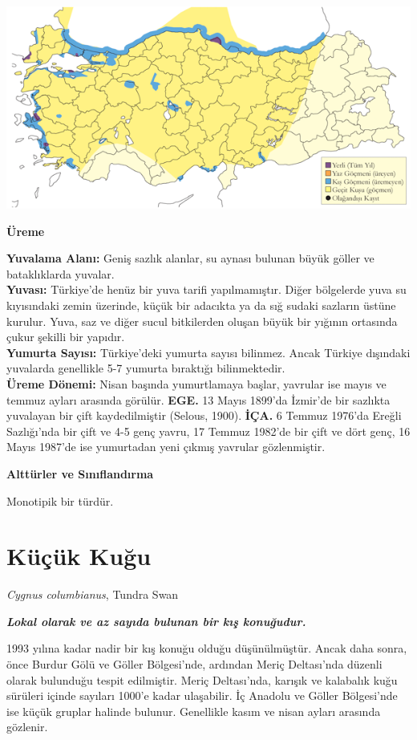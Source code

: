 \documentclass[
  a4paper,
  DIV=11,
  numbers=noendperiod]{scrreprt}
\begin{document}
\includegraphics{images/harita_Page_008.png}

\textbf{Üreme}

\textbf{Yuvalama Alanı:} Geniş sazlık alanlar, su aynası bulunan büyük
göller ve bataklıklarda yuvalar.\\
\textbf{Yuvası:} Türkiye'de henüz bir yuva tarifi yapılmamıştır. Diğer
bölgelerde yuva su kıyısındaki zemin üzerinde, küçük bir adacıkta ya da
sığ sudaki sazların üstüne kurulur. Yuva, saz ve diğer sucul bitkilerden
oluşan büyük bir yığının ortasında çukur şekilli bir yapıdır.\\
\textbf{Yumurta Sayısı:} Türkiye'deki yumurta sayısı bilinmez. Ancak
Türkiye dışındaki yuvalarda genellikle 5-7 yumurta bıraktığı
bilinmektedir.\\
\textbf{Üreme Dönemi:} Nisan başında yumurtlamaya başlar, yavrular ise
mayıs ve temmuz ayları arasında görülür. \textbf{EGE.} 13 Mayıs 1899'da
İzmir'de bir sazlıkta yuvalayan bir çift kaydedilmiştir (Selous, 1900).
\textbf{İÇA.} 6 Temmuz 1976'da Ereğli Sazlığı'nda bir çift ve 4-5 genç
yavru, 17 Temmuz 1982'de bir çift ve dört genç, 16 Mayıs 1987'de ise
yumurtadan yeni çıkmış yavrular gözlenmiştir.

\textbf{Alttürler ve Sınıflandırma}

Monotipik bir türdür.

\section{Küçük Kuğu}\label{kuxfcuxe7uxfck-kuux11fu}

\emph{Cygnus columbianus}, Tundra Swan

\textbf{\emph{Lokal olarak ve az sayıda bulunan bir kış konuğudur.}}

1993 yılına kadar nadir bir kış konuğu olduğu düşünülmüştür. Ancak daha
sonra, önce Burdur Gölü ve Göller Bölgesi'nde, ardından Meriç
Deltası'nda düzenli olarak bulunduğu tespit edilmiştir. Meriç
Deltası'nda, karışık ve kalabalık kuğu sürüleri içinde sayıları 1000'e
kadar ulaşabilir. İç Anadolu ve Göller Bölgesi'nde ise küçük gruplar
halinde bulunur. Genellikle kasım ve nisan ayları arasında gözlenir.
\end{document}
